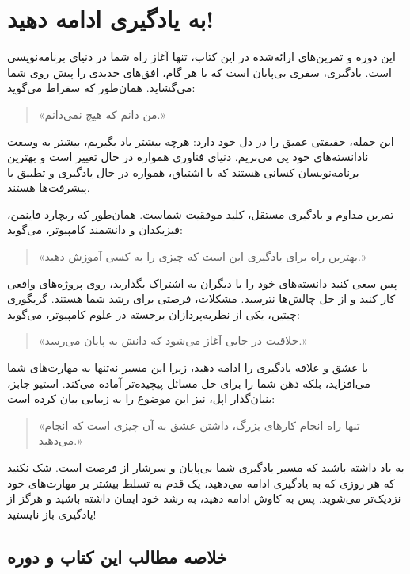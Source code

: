 \documentclass[b5paper,12pt]{article}
\begin{document}
	\section*{به یادگیری ادامه دهید!}

	این دوره و تمرین‌های ارائه‌شده در این کتاب، تنها آغاز راه شما در دنیای برنامه‌نویسی است. یادگیری، سفری بی‌پایان است که با هر گام، افق‌های جدیدی را پیش روی شما می‌گشاید. همان‌طور که سقراط می‌گوید:

	\begin{quote}
	«من دانم که هیچ نمی‌دانم.»
	\end{quote}

	این جمله، حقیقتی عمیق را در دل خود دارد: هرچه بیشتر یاد بگیریم، بیشتر به وسعت نادانسته‌های خود پی می‌بریم. دنیای فناوری همواره در حال تغییر است و بهترین برنامه‌نویسان کسانی هستند که با اشتیاق، همواره در حال یادگیری و تطبیق با پیشرفت‌ها هستند.

	تمرین مداوم و یادگیری مستقل، کلید موفقیت شماست. همان‌طور که ریچارد فاینمن، فیزیکدان و دانشمند کامپیوتر، می‌گوید:

	\begin{quote}
	«بهترین راه برای یادگیری این است که چیزی را به کسی آموزش دهید.»
	\end{quote}

	پس سعی کنید دانسته‌های خود را با دیگران به اشتراک بگذارید، روی پروژه‌های واقعی کار کنید و از حل چالش‌ها نترسید. مشکلات، فرصتی برای رشد شما هستند. گریگوری چیتین، یکی از نظریه‌پردازان برجسته در علوم کامپیوتر، می‌گوید:

	\begin{quote}
	«خلاقیت در جایی آغاز می‌شود که دانش به پایان می‌رسد.»
	\end{quote}

	با عشق و علاقه یادگیری را ادامه دهید، زیرا این مسیر نه‌تنها به مهارت‌های شما می‌افزاید، بلکه ذهن شما را برای حل مسائل پیچیده‌تر آماده می‌کند. استیو جابز، بنیان‌گذار اپل، نیز این موضوع را به زیبایی بیان کرده است:

	\begin{quote}
	«تنها راه انجام کارهای بزرگ، داشتن عشق به آن چیزی است که انجام می‌دهید.»
	\end{quote}

	به یاد داشته باشید که مسیر یادگیری شما بی‌پایان و سرشار از فرصت است. شک نکنید که هر روزی که به یادگیری ادامه می‌دهید، یک قدم به تسلط بیشتر بر مهارت‌های خود نزدیک‌تر می‌شوید. پس به کاوش ادامه دهید، به رشد خود ایمان داشته باشید و هرگز از یادگیری باز نایستید!

		
	\subsection*{خلاصه مطالب این کتاب و دوره}
	
\end{document}
